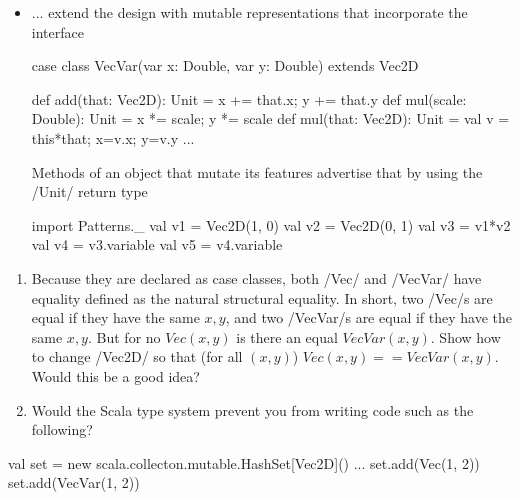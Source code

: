 \documentclass{ip3}
\begin{document}
\begin{foil}
\begin{itemize}
\item ... extend the design with mutable representations that incorporate the interface
\begin{-code}  

  case class VecVar(var x: Double, var y: Double) extends Vec2D  { 
  
       def add(that:  Vec2D):  Unit   = { x += that.x; y += that.y }              
       def mul(scale: Double): Unit   = { x *= scale; y *= scale }
       def mul(that:  Vec2D):  Unit   = { val v = this*that; x=v.x; y=v.y }
       ...
  }
\end{-code} 
\vitem Methods of an object that mutate its features advertise that by using the \sc/Unit/ return type
\begin{code*}[Vec2D.sc]
import Patterns._
val v1 = Vec2D(1, 0)
val v2 = Vec2D(0, 1)
val v3 = v1*v2
val v4 = v3.variable
val v5 = v4.variable    
\end{code*}
\end{itemize}
\begin{exercise}
\begin{enumerate}
\item Because they are declared as case classes, both \sc/Vec/ and \sc/VecVar/ have equality
defined as the natural structural equality. In short, two \sc/Vec/s are equal if they have
the same $x, y$, and two \sc/VecVar/s are equal if they have
the same $x, y$. But for no $Vec(x,y)$ is there an equal $VecVar(x,y)$. Show how to
change \sc/Vec2D/ so that (for all $(x,y)$) $Vec(x,y)==VecVar(x,y)$. Would this be a 
good idea? 

\item Would the Scala type system prevent you from writing code such as the following?
\end{enumerate}
\begin{-scala}
  val set = new scala.collecton.mutable.HashSet[Vec2D]()
  ...
  set.add(Vec(1, 2)) 
  set.add(VecVar(1, 2)) 
\end{-scala}


\end{exercise}
\end{foil}
\end{document}
